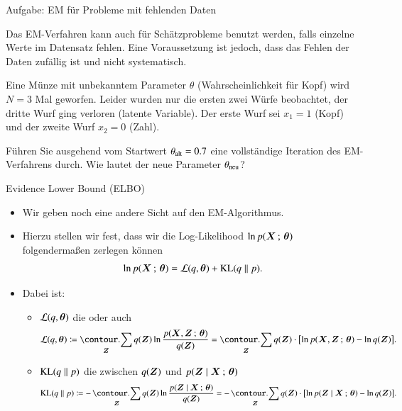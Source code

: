 \begin{frame}{Aufgabe: EM für Probleme mit fehlenden Daten}{}
	\begin{mytask}
		Das EM-Verfahren kann auch für Schätzprobleme benutzt werden, falls einzelne Werte im Datensatz fehlen.
		Eine Voraussetzung ist jedoch, dass das Fehlen der Daten zufällig ist und nicht systematisch.
		
		Eine Münze mit unbekanntem Parameter $\theta$ (Wahrscheinlichkeit für Kopf) wird $N = 3$ Mal geworfen.
		Leider wurden nur die ersten zwei Würfe beobachtet, der dritte Wurf ging verloren (latente Variable). Der erste Wurf sei $x_1 = 1$ (Kopf)
		und der zweite Wurf $x_2 = 0$ (Zahl).
		
		Führen Sie ausgehend vom Startwert $\theta_{\text{alt}} = 0.7$ eine vollständige Iteration des EM-Verfahrens durch.
		Wie lautet der neue Parameter $\theta_{\text{neu}}$?
	\end{mytask}
\end{frame}


\begin{frame}{Evidence Lower Bound (ELBO)}{}
	\begin{itemize}
		\item Wir geben noch eine andere Sicht auf den EM-Algorithmus.
		\item Hierzu stellen wir fest, dass wir die Log-Likelihood $\ln p(\bm{X} \,;\, \bm{\theta})$ folgendermaßen zerlegen können
		\begin{equation} \label{eq:em-decomposition-incomplete-log-likelihood}
			\ln p(\bm{X} \,;\, \bm{\theta}) = \mathcal{L}(q, \bm{\theta}) + \text{KL}(q \parallel p).
		\end{equation}
		\item Dabei ist:
		\begin{itemize}
			\item $\mathcal{L}(q, \bm{\theta})$ die  oder auch 
			\begin{equation} \label{eq:em-elbo}
				\sL(q, \btheta)
					\coloneqq \sum_{\bZ} q(\bZ) \ln \frac{p(\bX, \bZ \param \btheta)}{q(\bZ)}
					= \sum_{\bZ} q(\bZ) \cdot \bigl[ \ln p(\bX, \bZ \param \btheta) - \ln q(\bZ) \bigr].
			\end{equation}
			\item $\text{KL}(q \parallel p)$ die  zwischen $q(\bm{Z})$ und $p(\bm{Z} \mid \bm{X} \,;\, \bm{\theta})$
			\begin{equation} \label{eq:em-kl-div}
				\KL(q \parallel p)
					\coloneqq -\sum_{\bZ} q(\bZ) \ln \frac{p(\bZ \mid \bX \param \btheta)}{q(\bZ)}
					= -\sum_{\bZ} q(\bZ) \cdot \bigl[ \ln p(\bZ \mid \bX \param \btheta) - \ln q(\bZ) \bigr].
			\end{equation}
		\end{itemize}
	\end{itemize}
\end{frame}


